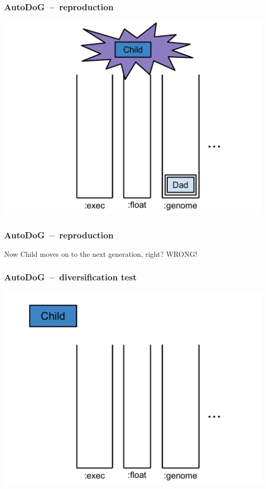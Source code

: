 \documentclass{beamer}
\newcommand{\linespace}{\vskip 0.25cm}
\begin{document}
\begin{frame}
	\frametitle{AutoDoG~--~reproduction}
	\includegraphics[width=.9\textwidth]{Illustrations/autodog_17.PDF}
\end{frame}

\begin{frame}
	\frametitle{AutoDoG~--~reproduction}
	\centering
	Now Child moves on to the next generation, right?
	\pause
	\linespace\linespace
	\large WRONG!
\end{frame}

\begin{frame}
	\frametitle{AutoDoG~--~diversification test}
	\includegraphics[width=.9\textwidth]{Illustrations/test_1.PDF}
\end{frame}
\end{document}
